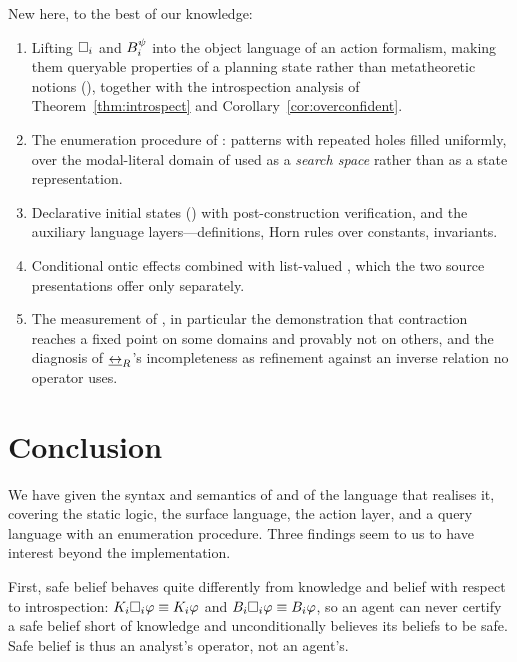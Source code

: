 \documentclass[11pt,a4paper]{article}
\begin{document}
New here, to the best of our knowledge:
\begin{enumerate}
  \item Lifting $\Box_{i}$ and $B^{\psi}_{i}$ into the object language of an action
    formalism, making them queryable properties of a planning state rather than metatheoretic
    notions (), together with the introspection analysis of
    Theorem~\ref{thm:introspect} and Corollary~\ref{cor:overconfident}.
  \item The enumeration procedure of : patterns with repeated holes filled
    uniformly, over the modal-literal domain of \citet{muise2015} used as a \emph{search
    space} rather than as a state representation.
  \item Declarative initial states () with post-construction verification,
    and the auxiliary language layers---definitions, Horn rules over constants, invariants.
  \item Conditional ontic effects combined with list-valued , which the two
    source presentations offer only separately.
  \item The measurement of , in particular the demonstration that contraction
    reaches a fixed point on some domains and provably not on others, and the diagnosis of
    $\mathbin{\underline{\leftrightarrow}_{R}}$'s incompleteness as refinement against an inverse relation no operator uses.
\end{enumerate}

\section{Conclusion}
\label{sec:conclusion}

We have given the syntax and semantics of \mBplus{} and of the \delhi{} language that
realises it, covering the static logic, the surface language, the action layer, and a query
language with an enumeration procedure. Three findings seem to us to have interest beyond the
implementation.

First, safe belief behaves quite differently from knowledge and belief with respect to
introspection: $K_{i}\Box_{i}\varphi \equiv K_{i}\varphi$ and $B_{i}\Box_{i}\varphi \equiv
B_{i}\varphi$, so an agent can never certify a safe belief short of knowledge and
unconditionally believes its beliefs to be safe. Safe belief is thus an analyst's operator, not
an agent's.
\end{document}

